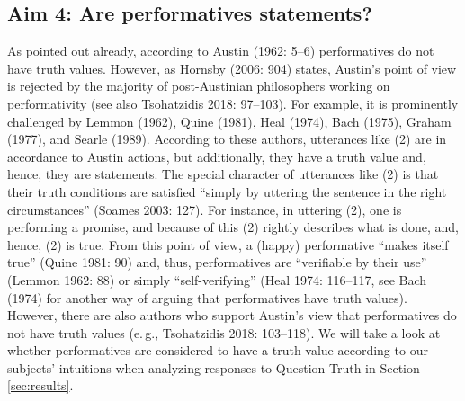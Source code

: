 \documentclass[egregdoesnotlikesansseriftitles,12pt]{scrartcl}
\begin{document}
\subsection{Aim 4: Are performatives statements?}
As pointed out already, according to Austin (1962: 5--6) performatives do not have truth values. However, as Hornsby (2006: 904) states, Austin's point of view is rejected by the majority of post-Austinian philosophers working on performativity (see also Tsohatzidis 2018: 97--103). For example, it is prominently challenged by Lemmon (1962), Quine (1981), Heal (1974), Bach (1975), Graham (1977), and Searle (1989). According to these authors, utterances like (2) are in accordance to Austin actions, but additionally, they have a truth value and, hence, they are statements. The special character of utterances like (2) is that their truth conditions are satisfied ``simply by uttering the sentence in the right circumstances'' (Soames 2003: 127). For instance, in uttering (2), one is performing a promise, and because of this (2) rightly describes what is done, and, hence, (2) is true. From this point of view, a (happy) performative ``makes itself true'' (Quine 1981: 90) and, thus, performatives are ``verifiable by their use'' (Lemmon 1962: 88) or simply ``self-verifying'' (Heal 1974: 116--117, see Bach (1974) for another way of arguing that performatives have truth values). However, there are also authors who support Austin's view that performatives do not have truth values (e.\,g., Tsohatzidis 2018: 103--118). We will take a look at whether performatives are considered to have a truth value according to our subjects' intuitions when analyzing responses to Question Truth in Section \ref{sec:results}.


\end{document}
